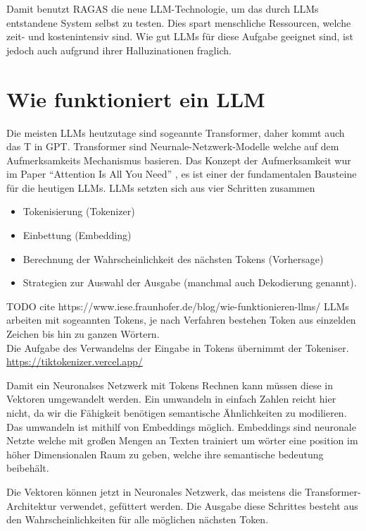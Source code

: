 Damit benutzt RAGAS die neue LLM-Technologie, um das durch LLMs entstandene System selbst zu testen. Dies spart menschliche Ressourcen, welche zeit- und kostenintensiv sind.
Wie gut LLMs für diese Aufgabe geeignet sind, ist jedoch auch aufgrund ihrer Halluzinationen fraglich.

\section{Wie funktioniert ein LLM}
Die meisten LLMs heutzutage sind sogeannte Transformer, daher kommt auch das T in GPT. Transformer sind Neurnale-Netzwerk-Modelle welche auf dem Aufmerksamkeits Mechanismus basieren.
Das Konzept der Aufmerksamkeit wur im Paper \enquote{Attention Is All You Need} \cite{vaswani2017attention}, es ist einer der fundamentalen Bausteine für die heutigen LLMs.
LLMs setzten sich aus vier Schritten zusammen
\begin{itemize}
    \item Tokenisierung (Tokenizer)
    \item Einbettung (Embedding)
    \item Berechnung der Wahrscheinlichkeit des nächsten Tokens (Vorhersage)
    \item Strategien zur Auswahl der Ausgabe (manchmal auch Dekodierung genannt).
\end{itemize}

TODO cite https://www.iese.fraunhofer.de/blog/wie-funktionieren-llms/
LLMs arbeiten mit sogeannten Tokens, je nach Verfahren bestehen Token aus einzelden Zeichen bis hin zu ganzen Wörtern.\\
Die Aufgabe des Verwandelns der Eingabe in Tokens übernimmt der Tokeniser. \url{https://tiktokenizer.vercel.app/}

Damit ein Neuronalses Netzwerk mit Tokens Rechnen kann müssen diese in Vektoren umgewandelt werden. Ein umwandeln in einfach Zahlen reicht hier nicht, da wir die Fähigkeit benötigen semantische Ähnlichkeiten zu modilieren.\\
Das umwandeln ist mithilf von Embeddings möglich. Embeddings sind neuronale Netzte welche mit großen Mengen an Texten trainiert um wörter eine position im höher Dimensionalen Raum zu geben, welche ihre semantische bedeutung beibehält.

Die Vektoren können jetzt in Neuronales Netzwerk, das meistens die Transformer-Architektur verwendet, gefüttert werden.
Die Ausgabe diese Schrittes besteht aus den Wahrscheinlichkeiten für alle möglichen nächsten Token.


